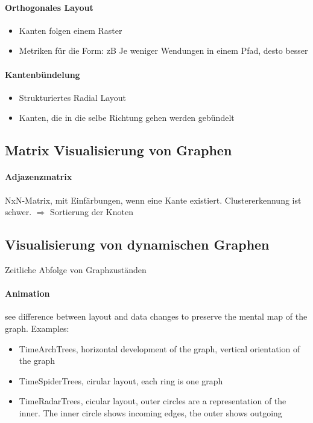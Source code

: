 \documentclass[ngerman]{scrartcl}
\begin{document}
\paragraph{Orthogonales Layout}
\begin{itemize}
  \item Kanten folgen einem Raster
  \item Metriken für die Form: zB Je weniger Wendungen in einem Pfad, desto besser
\end{itemize}

\paragraph{Kantenbündelung}
\begin{itemize}
  \item Strukturiertes Radial Layout
  \item Kanten, die in die selbe Richtung gehen werden gebündelt
\end{itemize}

\subsection{Matrix Visualisierung von Graphen}

\paragraph{Adjazenzmatrix} NxN-Matrix, mit Einfärbungen, wenn eine Kante existiert. Clustererkennung ist schwer. $ \Rightarrow $ Sortierung der Knoten


\subsection{Visualisierung von dynamischen Graphen}
Zeitliche Abfolge von Graphzuständen

\paragraph{Animation} see difference between layout and data changes to preserve the mental map of the graph. Examples:
\begin{itemize} 
  \item TimeArchTrees, horizontal development of the graph, vertical orientation of the graph  
  \item TimeSpiderTrees, cirular layout, each ring is one graph
  \item TimeRadarTrees, cicular layout, outer circles are a representation of the inner. The inner circle shows incoming edges, the outer shows outgoing
\end{itemize}
\end{document}
